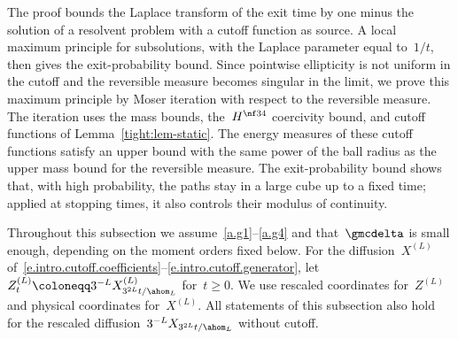 \documentclass[11pt]{amsart}
\begin{document}
\smallskip

The proof bounds the Laplace transform of the exit time by one minus the solution of a resolvent problem with a cutoff function as source. A local maximum principle for subsolutions, with the Laplace parameter equal to~$1/t$, then gives the exit-probability bound. Since pointwise ellipticity is not uniform in the cutoff and the reversible measure becomes singular in the limit, we prove this maximum principle by Moser iteration with respect to the reversible measure. The iteration uses the mass bounds, the~$H^{\nf34}$ coercivity bound, and cutoff functions of Lemma~\ref{tight:lem-static}. The energy measures of these cutoff functions satisfy an upper bound with the same power of the ball radius as the upper mass bound for the reversible measure. The exit-probability bound shows that, with high probability, the paths stay in a large cube up to a fixed time; applied at stopping times, it also controls their modulus of continuity.

\smallskip

Throughout this subsection we assume~\ref{a.g1}--\ref{a.g4} and that~$\gmcdelta$ is small enough, depending on the moment orders fixed below. For the diffusion~$X^{(L)}$ of~\eqref{e.intro.cutoff.coefficients}--\eqref{e.intro.cutoff.generator}, let~$Z_t^{(L)}\coloneqq3^{-L}X_{3^{2L}t/\ahom_L}^{(L)}$ for~$t\geq0$. We use rescaled coordinates for~$Z^{(L)}$ and physical coordinates for~$X^{(L)}$. All statements of this subsection also hold for the rescaled diffusion~$3^{-L}X_{3^{2L}t/\ahom_L}$ without cutoff.

\smallskip
\end{document}
